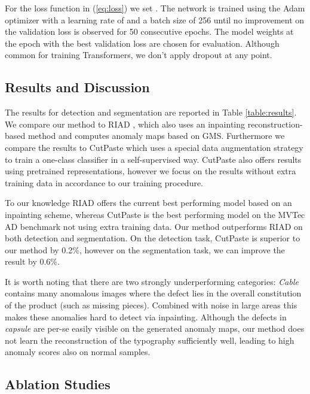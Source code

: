 \documentclass[runningheads]{llncs}
\begin{document}
For the loss function  in (\ref{eq:loss}) we set . The network is trained using the Adam optimizer with a learning rate of  and a batch size of 256 until no improvement on the validation loss is observed for 50 consecutive epochs. The model weights at the epoch with the best validation loss are chosen for evaluation.
Although common for training Transformers, we don't apply dropout at any point.

\subsection{Results and Discussion}

The results for detection and segmentation are reported in Table \ref{table:results}. We compare our method to RIAD \cite{ZAVRTANIK2021107706}, which also uses an inpainting reconstruction-based method and computes anomaly maps based on GMS. Furthermore we compare the results to CutPaste \cite{li2021cutpaste} which uses a special data augmentation strategy to train a one-class classifier in a self-supervised way. CutPaste also offers results using pretrained representations, however we focus on the results without extra training data in accordance to our training procedure.

To our knowledge RIAD offers the current best performing model based on an inpainting scheme, whereas CutPaste is the best performing model on the MVTec AD benchmark not using extra training data. Our method outperforms RIAD on both detection and segmentation. On the detection task, CutPaste is superior to our method by 0.2\%, however on the segmentation task, we can improve the result by 0.6\%.

It is worth noting that there are two strongly underperforming categories: \textit{Cable} contains many anomalous images where the defect lies in the overall constitution of the product (such as missing pieces). Combined with noise in large areas this makes these anomalies hard to detect via inpainting. Although the defects in \textit{capsule} are per-se easily visible on the generated anomaly maps, our method does not learn the reconstruction of the typography sufficiently well, leading to high anomaly scores also on normal samples.

\subsection{Ablation Studies}
\label{sec:ablation_studies}
\end{document}

